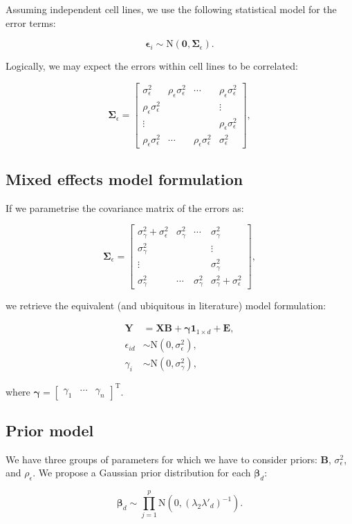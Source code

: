 \documentclass[a4paper,hidelinks]{article}
\newcommand{\bbeta}{\bm{\beta}}
\newcommand{\bepsilon}{\bm{\epsilon}}
\newcommand{\bSigma}{\bm{\Sigma}}
\newcommand{\Y}{\mathbf{Y}}
\newcommand{\X}{\mathbf{X}}
\newcommand{\bgamma}{\bm{\gamma}}
\newcommand{\B}{\mathbf{B}}
\newcommand{\Em}{\mathbf{E}}
\newcommand{\0}{\bm{0}}
\newcommand{\ones}{\mathbf{1}}
\newcommand{\tr}{^{\text{T}}}
\newcommand{\N}{\text{N}}
\renewcommand{\(}{\left(}
\renewcommand{\)}{\right)}
\renewcommand{\[}{\left[}
\renewcommand{\]}{\right]}
\begin{document}
Assuming independent cell lines, we use the following statistical model for the error terms:

$$
\bepsilon_i \sim \N (\0, \bSigma_{\epsilon}).
$$

Logically, we may expect the errors within cell lines to be correlated:

$$
\bSigma_{\epsilon} = \begin{bmatrix}
\sigma^2_{\epsilon} & \rho_{\epsilon} \sigma^2_{\epsilon} & \cdots & \rho_{\epsilon} \sigma^2_{\epsilon} \\
\rho_{\epsilon} \sigma^2_{\epsilon} & & & \vdots \\
\vdots & & & \rho_{\epsilon} \sigma^2_{\epsilon} \\
\rho_{\epsilon} \sigma^2_{\epsilon} & \cdots & \rho_{\epsilon} \sigma^2_{\epsilon} & \sigma^2_{\epsilon}
\end{bmatrix},
$$

\subsection{Mixed effects model formulation}
If we parametrise the covariance matrix of the errors as:

$$
\bSigma_{\epsilon} = \begin{bmatrix}
\sigma^2_{\gamma} + \sigma^2_{\epsilon} & \sigma^2_{\gamma} & \cdots & \sigma^2_{\gamma} \\
\sigma^2_{\gamma} & & & \vdots \\
\vdots & & & \sigma^2_{\gamma} \\
\sigma^2_{\gamma} & \cdots & \sigma^2_{\gamma} & \sigma^2_{\gamma} + \sigma^2_{\epsilon}
\end{bmatrix},
$$

we retrieve the equivalent (and ubiquitous in literature) model formulation:

\begin{align*}
\Y & = \X \B + \bgamma \ones_{1 \times d} + \Em, \\
\epsilon_{id} & \sim \N (0, \sigma_{\epsilon}^2), \\
\gamma_i & \sim \N(0, \sigma^2_{\gamma}),
\end{align*}

where $\bgamma = \begin{bmatrix} \gamma_1 & \cdots & \gamma_n \end{bmatrix} \tr$. 

\subsection{Prior model}

We have three groups of parameters for which we have to consider priors: $\B$, $\sigma^2_{\epsilon}$, and $\rho_{\epsilon}$. We propose a Gaussian prior distribution for each $\bbeta_d$:

$$
\bbeta_d \sim \prod_{j=1}^p \N(0, (\lambda_2 \lambda'_d)^{-1}).
$$

 

\end{document}
